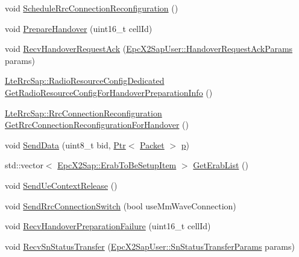 \begin{DoxyCompactItemize}
\item 
void \hyperlink{classns3_1_1UeManager_add763d882c14c2f1414167668f6ca095}{Schedule\+Rrc\+Connection\+Reconfiguration} ()
\item 
void \hyperlink{classns3_1_1UeManager_a1d842520ee54f281ee7eefc2a62f7844}{Prepare\+Handover} (uint16\+\_\+t cell\+Id)
\item 
void \hyperlink{classns3_1_1UeManager_ad2e93daf91532b0fd263355b2416330d}{Recv\+Handover\+Request\+Ack} (\hyperlink{structns3_1_1EpcX2Sap_1_1HandoverRequestAckParams}{Epc\+X2\+Sap\+User\+::\+Handover\+Request\+Ack\+Params} params)
\item 
\hyperlink{structns3_1_1LteRrcSap_1_1RadioResourceConfigDedicated}{Lte\+Rrc\+Sap\+::\+Radio\+Resource\+Config\+Dedicated} \hyperlink{classns3_1_1UeManager_a310c374082bf0293d515592a15ecef4d}{Get\+Radio\+Resource\+Config\+For\+Handover\+Preparation\+Info} ()
\item 
\hyperlink{structns3_1_1LteRrcSap_1_1RrcConnectionReconfiguration}{Lte\+Rrc\+Sap\+::\+Rrc\+Connection\+Reconfiguration} \hyperlink{classns3_1_1UeManager_aa2119b7ea12cbe86401cb73690f67d9b}{Get\+Rrc\+Connection\+Reconfiguration\+For\+Handover} ()
\item 
void \hyperlink{classns3_1_1UeManager_a2288415129fd7319128599cf2681e780}{Send\+Data} (uint8\+\_\+t bid, \hyperlink{classns3_1_1Ptr}{Ptr}$<$ \hyperlink{classns3_1_1Packet}{Packet} $>$ \hyperlink{lte__link__budget__x2__handover__measures_8m_ac9de518908a968428863f829398a4e62}{p})
\item 
std\+::vector$<$ \hyperlink{structns3_1_1EpcX2Sap_1_1ErabToBeSetupItem}{Epc\+X2\+Sap\+::\+Erab\+To\+Be\+Setup\+Item} $>$ \hyperlink{classns3_1_1UeManager_aedc1779570a508b261381b0311811540}{Get\+Erab\+List} ()
\item 
void \hyperlink{classns3_1_1UeManager_ad1a1e702fc813b4260bcafaa4f4562ba}{Send\+Ue\+Context\+Release} ()
\item 
void \hyperlink{classns3_1_1UeManager_ab36bf5ac97f7023d2ef825124f95f839}{Send\+Rrc\+Connection\+Switch} (bool use\+Mm\+Wave\+Connection)
\item 
void \hyperlink{classns3_1_1UeManager_ae666e05868312327e759a738ba1e19f3}{Recv\+Handover\+Preparation\+Failure} (uint16\+\_\+t cell\+Id)
\item 
void \hyperlink{classns3_1_1UeManager_a5c5da485afc3315699f3ee3e8448aa09}{Recv\+Sn\+Status\+Transfer} (\hyperlink{structns3_1_1EpcX2Sap_1_1SnStatusTransferParams}{Epc\+X2\+Sap\+User\+::\+Sn\+Status\+Transfer\+Params} params)
\item 

\end{DoxyCompactItemize}
